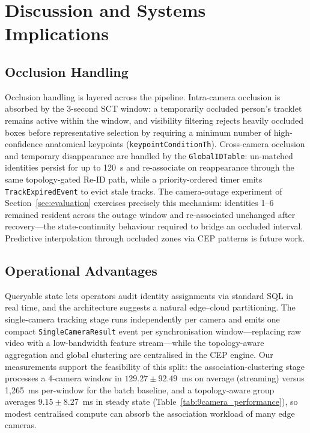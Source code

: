 \documentclass[conference]{IEEEtran}
\begin{document}
\section{Discussion and Systems Implications}
\label{sec:discussion}

\subsection{Occlusion Handling}
Occlusion handling is layered across the pipeline. Intra-camera occlusion is absorbed by the 3-second SCT window: a temporarily occluded person's tracklet remains active within the window, and visibility filtering rejects heavily occluded boxes before representative selection by requiring a minimum number of high-confidence anatomical keypoints (\texttt{keypointConditionTh}). Cross-camera occlusion and temporary disappearance are handled by the \texttt{GlobalIDTable}: un-matched identities persist for up to 120~s and re-associate on reappearance through the same topology-gated Re-ID path, while a priority-ordered timer emits \texttt{TrackExpiredEvent} to evict stale tracks. The camera-outage experiment of Section~\ref{sec:evaluation} exercises precisely this mechanism: identities 1--6 remained resident across the outage window and re-associated unchanged after recovery---the state-continuity behaviour required to bridge an occluded interval. Predictive interpolation through occluded zones via CEP patterns is future work.

\subsection{Operational Advantages}
Queryable state lets operators audit identity assignments via standard SQL in real time, and the architecture suggests a natural edge--cloud partitioning. The single-camera tracking stage runs independently per camera and emits one compact \texttt{SingleCameraResult} event per synchronisation window---replacing raw video with a low-bandwidth feature stream---while the topology-aware aggregation and global clustering are centralised in the CEP engine. Our measurements support the feasibility of this split: the association-clustering stage processes a 4-camera window in $129.27 \pm 92.49$~ms on average (streaming) versus 1{,}265~ms per-window for the batch baseline, and a topology-aware group averages $9.15 \pm 8.27$~ms in steady state (Table~\ref{tab:9camera_performance}), so modest centralised compute can absorb the association workload of many edge cameras.
\end{document}
